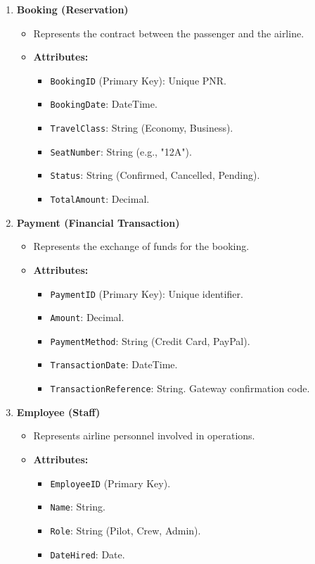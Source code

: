 \documentclass[12pt, a4paper]{article}
\begin{document}
\begin{enumerate}
		\item \textbf{Booking (Reservation)}
		\begin{itemize}
			\item Represents the contract between the passenger and the airline.
			\item \textbf{Attributes:}
			\begin{itemize}
				\item \texttt{BookingID} (Primary Key): Unique PNR.
				\item \texttt{BookingDate}: DateTime.
				\item \texttt{TravelClass}: String (Economy, Business).
				\item \texttt{SeatNumber}: String (e.g., "12A").
				\item \texttt{Status}: String (Confirmed, Cancelled, Pending).
				\item \texttt{TotalAmount}: Decimal.
			\end{itemize}
		\end{itemize}
		
		\item \textbf{Payment (Financial Transaction)}
		\begin{itemize}
			\item Represents the exchange of funds for the booking.
			\item \textbf{Attributes:}
			\begin{itemize}
				\item \texttt{PaymentID} (Primary Key): Unique identifier.
				\item \texttt{Amount}: Decimal.
				\item \texttt{PaymentMethod}: String (Credit Card, PayPal).
				\item \texttt{TransactionDate}: DateTime.
				\item \texttt{TransactionReference}: String. Gateway confirmation code.
			\end{itemize}
		\end{itemize}
		
		\item \textbf{Employee (Staff)}
		\begin{itemize}
			\item Represents airline personnel involved in operations.
			\item \textbf{Attributes:}
			\begin{itemize}
				\item \texttt{EmployeeID} (Primary Key).
				\item \texttt{Name}: String.
				\item \texttt{Role}: String (Pilot, Crew, Admin).
				\item \texttt{DateHired}: Date.
			\end{itemize}
		\end{itemize}
	\end{enumerate}
	
\end{document}
